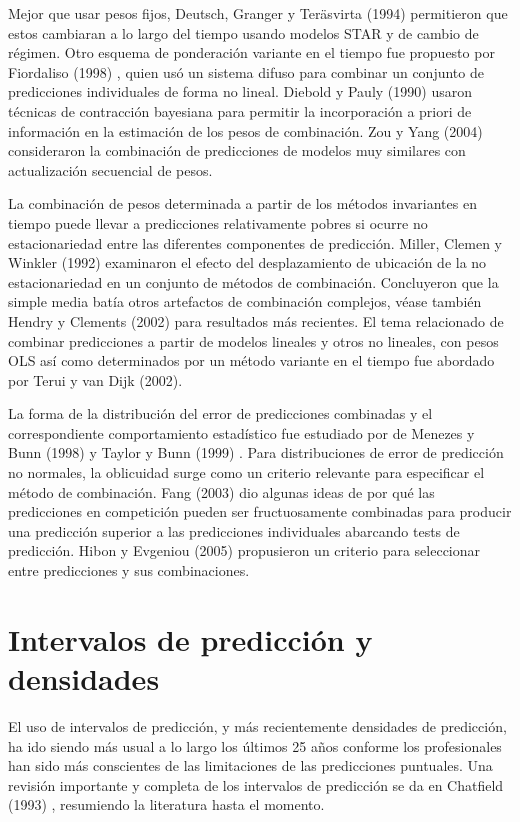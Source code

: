 \documentclass{llncs}
\begin{document}
Mejor que usar pesos fijos, Deutsch, Granger y Teräsvirta (1994) \cite{Deutsch199447} permitieron que estos cambiaran a lo largo del tiempo usando modelos STAR y de cambio de régimen. Otro esquema de ponderación variante en el tiempo fue propuesto por Fiordaliso (1998) \cite{Fiordaliso1998367}, quien usó un sistema difuso para combinar un conjunto de predicciones individuales de forma no lineal. Diebold y Pauly (1990) \cite{Diebold1990503} usaron técnicas de contracción bayesiana para permitir la incorporación a priori de información en la estimación de los pesos de combinación. Zou y Yang (2004) \cite{Zou200469} consideraron la combinación de predicciones de modelos muy similares con actualización secuencial de pesos.

La combinación de pesos determinada a partir de los métodos invariantes en tiempo puede llevar a predicciones relativamente pobres si ocurre no estacionariedad entre las diferentes componentes de predicción. Miller, Clemen y Winkler (1992) \cite{Miller1992515} examinaron el efecto del desplazamiento de ubicación de la no estacionariedad en un conjunto de  métodos de combinación. Concluyeron que la simple media batía otros artefactos de combinación complejos, véase también Hendry y Clements (2002) \cite{Hendry20021} para resultados más recientes. El tema relacionado de combinar predicciones a partir de modelos lineales y otros no lineales, con pesos OLS  así como determinados por un método variante en el tiempo fue abordado por Terui y van Dijk (2002)\cite{Terui2002421}.

La forma de la distribución del error de predicciones combinadas y el correspondiente comportamiento estadístico fue estudiado por de Menezes y Bunn (1998) \cite{DeMenezes1998415} y Taylor y Bunn (1999) \cite{Taylor1999325}. Para distribuciones de error de predicción  no normales, la oblicuidad surge como un criterio relevante para especificar el método de combinación. Fang (2003) \cite{Fang200387} dio algunas ideas de por qué las predicciones en competición pueden ser fructuosamente combinadas para producir una predicción superior a las predicciones individuales abarcando tests de predicción. Hibon y Evgeniou (2005) \cite{Hibon200515} propusieron un criterio para seleccionar entre predicciones y sus combinaciones.

\section{Intervalos de predicción y densidades}
El uso de intervalos de predicción, y más recientemente densidades de predicción, ha ido siendo más usual a lo largo los últimos 25 años conforme los profesionales han sido más conscientes de las limitaciones de las predicciones puntuales. Una revisión importante y completa de los intervalos de predicción se da en Chatfield (1993) \cite{Chatfield1993121}, resumiendo la literatura hasta el momento.
\end{document}

